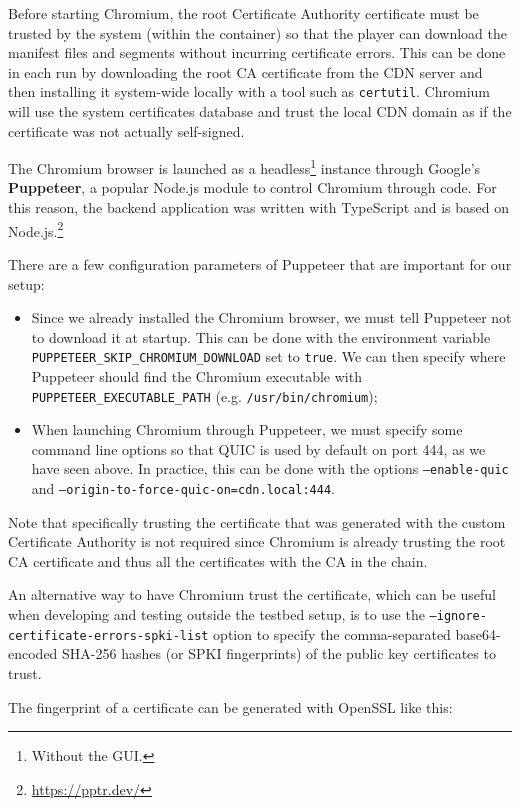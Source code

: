 Before starting Chromium, the root Certificate Authority certificate must be trusted by the system (within the container) so that the player can download the manifest files and segments without incurring certificate errors. This can be done in each run by downloading the root CA certificate from the CDN server and then installing it system-wide locally with a tool such as \texttt{certutil}. Chromium will use the system certificates database and trust the local CDN domain as if the certificate was not actually self-signed.

The Chromium browser is launched as a headless\footnote{Without the GUI.} instance through Google's \textbf{Puppeteer}, a popular Node.js module to control Chromium through code. For this reason, the backend application was written with TypeScript and is based on Node.js.\footnote{\url{https://pptr.dev/}}

There are a few configuration parameters of Puppeteer that are important for our setup:

\begin{itemize}
    \item Since we already installed the Chromium browser, we must tell Puppeteer not to download it at startup. This can be done with the environment variable \texttt{PUPPETEER\_SKIP\_CHROMIUM\_DOWNLOAD} set to \texttt{true}. We can then specify where Puppeteer should find the Chromium executable with \texttt{PUPPETEER\_EXECUTABLE\_PATH} (e.g. \texttt{/usr/bin/chromium});
    \item When launching Chromium through Puppeteer, we must specify some command line options so that QUIC is used by default on port 444, as we have seen above. In practice, this can be done with the options \texttt{--enable-quic} and \texttt{--origin-to-force-quic-on=cdn.local:444}.
\end{itemize}

Note that specifically trusting the certificate that was generated with the custom Certificate Authority is not required since Chromium is already trusting the root CA certificate and thus all the certificates with the CA in the chain.

An alternative way to have Chromium trust the certificate, which can be useful when developing and testing outside the testbed setup, is to use the \texttt{--ignore-certificate-errors-spki-list} option to specify the comma-separated base64-encoded SHA-256 hashes (or SPKI fingerprints) of the public key certificates to trust.

The fingerprint of a certificate can be generated with OpenSSL like this:

